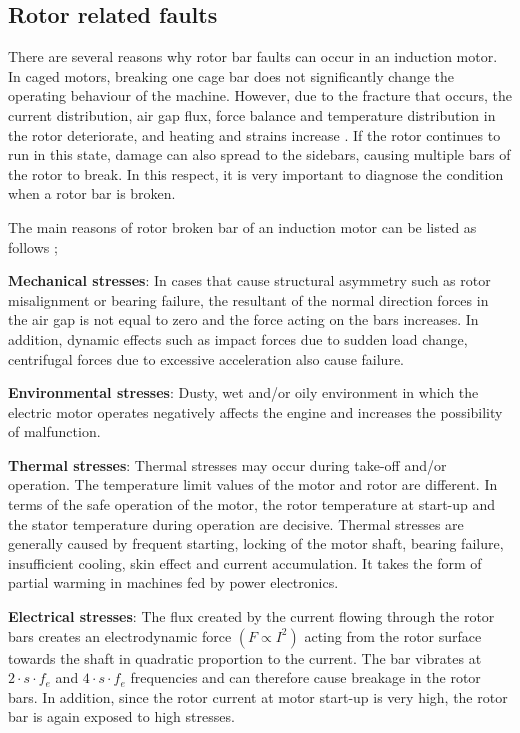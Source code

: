 \subsection{Rotor related faults}

There are several reasons why rotor bar faults can occur in an induction motor. In caged motors, breaking one cage bar does not significantly change the operating behaviour of the machine. However, due to the fracture that occurs, the current distribution, air gap flux, force balance and temperature distribution in the rotor deteriorate, and heating and strains increase \cite{imeryuz2009asenkron}. If the rotor continues to run in this state, damage can also spread to the sidebars, causing multiple bars of the rotor to break. In this respect, it is very important to diagnose the condition when a rotor bar is broken.

The main reasons of rotor broken bar of an induction motor can be listed as follows \cite{imeryuz2009asenkron,filippetti2013condition,bonnett1999root,Siddique};

\textbf{Mechanical stresses}: In cases that cause structural asymmetry such as rotor misalignment or bearing failure, the resultant of the normal direction forces in the air gap is not equal to zero and the force acting on the bars increases. In addition, dynamic effects such as impact forces due to sudden load change, centrifugal forces due to excessive acceleration also cause failure.

\textbf{Environmental stresses}: Dusty, wet and/or oily environment in which the electric motor operates negatively affects the engine and increases the possibility of malfunction.

\textbf{Thermal stresses}: Thermal stresses may occur during take-off and/or operation. The temperature limit values of the motor and rotor are different. In terms of the safe operation of the motor, the rotor temperature at start-up and the stator temperature during operation are decisive. Thermal stresses are generally caused by frequent starting, locking of the motor shaft, bearing failure, insufficient cooling, skin effect and current accumulation. It takes the form of partial warming in machines fed by power electronics.

\textbf{Electrical stresses}: The flux created by the current flowing through the rotor bars creates an electrodynamic force $(F \propto I^2)$ acting from the rotor surface towards the shaft in quadratic proportion to the current. The bar vibrates at $2\cdot s\cdot f_{e}$ and $4\cdot s\cdot f_{e}$  frequencies and can therefore cause breakage in the rotor bars. In addition, since the rotor current at motor start-up is very high, the rotor bar is again exposed to high stresses.

